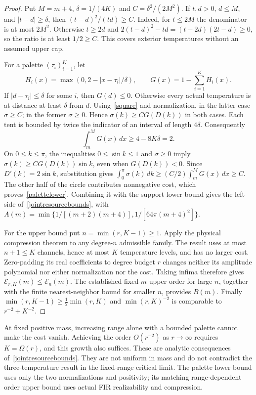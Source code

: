 \documentclass[11pt]{article}
\begin{document}
\begin{proof}
Put $M=m+4$, $\delta=1/(4K)$ and $C=\delta^2/(2M^2)$. If $t,d>0$, $d\le M$, and $|t-d|\ge\delta$, then $(t-d)^2/(td)\ge C$. Indeed, for $t\le2M$ the denominator is at most $2M^2$. Otherwise $t\ge2d$ and $2(t-d)^2-td=(t-2d)(2t-d)\ge0$, so the ratio is at least $1/2\ge C$. This covers exterior temperatures without an assumed upper cap.

For a palette $(\tau_i)_{i=1}^K$, let
\[
 H_i(x)=\max(0,2-|x-\tau_i|/\delta),\qquad G(x)=1-\sum_{i=1}^K H_i(x).
\]
If $|d-\tau_i|\le\delta$ for some $i$, then $G(d)\le0$. Otherwise every actual temperature is at distance at least $\delta$ from $d$. Using~\eqref{square} and normalization, in the latter case $\sigma\ge C$; in the former $\sigma\ge0$. Hence $\sigma(k)\ge C G(D(k))$ in both cases. Each tent is bounded by twice the indicator of an interval of length $4\delta$. Consequently
\[
 \int_m^M G(x)\,dx\ge4-8K\delta=2.
\]
On $0\le k\le\pi$, the inequalities $0\le\sin k\le1$ and $\sigma\ge0$ imply $\sigma(k)\ge CG(D(k))\sin k$, even when $G(D(k))<0$. Since $D'(k)=2\sin k$, substitution gives $\int_0^\pi\sigma(k)\,dk\ge (C/2)\int_m^M G(x)\,dx\ge C$. The other half of the circle contributes nonnegative cost, which proves~\eqref{palettelower}. Combining it with the support lower bound gives the left side of~\eqref{jointresourcebounds}, with $A(m)=\min\{1/[(m+2)(m+4)],1/[64\pi(m+4)^2]\}$.

For the upper bound put $n=\min(r,K-1)\ge1$. Apply the physical compression theorem to any degree-$n$ admissible family. The result uses at most $n+1\le K$ channels, hence at most $K$ temperature levels, and has no larger cost. Zero-padding its real coefficients to degree budget $r$ changes neither its amplitude polynomial nor either normalization nor the cost. Taking infima therefore gives $\mathcal E_{r,K}(m)\le\mathcal E_n(m)$. The established fixed-$m$ upper order for large $n$, together with the finite nearest-neighbor bound for smaller $n$, provides $B(m)$. Finally $\min(r,K-1)\ge\tfrac12\min(r,K)$ and $\min(r,K)^{-2}$ is comparable to $r^{-2}+K^{-2}$.
\end{proof}
At fixed positive mass, increasing range alone with a bounded palette cannot make the cost vanish. Achieving the order $O(r^{-2})$ as $r\to\infty$ requires $K=\Omega(r)$, and this growth also suffices. These are analytic consequences of~\eqref{jointresourcebounds}. They are not uniform in mass and do not contradict the three-temperature result in the fixed-range critical limit. The palette lower bound uses only the two normalizations and positivity; its matching range-dependent order upper bound uses actual FIR realizability and compression.
\end{document}
